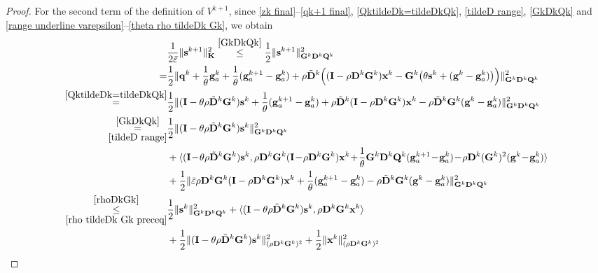 \documentclass[12pt,draftcls,onecolumn]{IEEEtran}
\newcommand{\bG}{{\mathbf{G}}}
\newcommand{\bK}{{\mathbf{K}}}
\begin{document}
\begin{proof}
For the second term of the definition of $V^{k+1}$, since \eqref{zk final}--\eqref{qk+1 final}, \eqref{QktildeDk=tildeDkQk}, \eqref{tildeD range}, \eqref{GkDkQk} and \eqref{range underline varepsilon}--\eqref{theta rho tildeDk Gk}, we obtain
\begin{align}
	&\frac{1}{2\bar{\varepsilon}} \|\mathbf{s}^{k+1}\|^2_{\bK} \overset{\eqref{GkDkQk}}{\leq} \frac{1}{2} \|\mathbf{s}^{k+1}\|^2_{ \mathbf{G}^k\mathbf{D}^k\mathbf{Q}^k} \notag\\
	=& \frac{1}{2}\|\mathbf{q}^k+\frac{1}{\theta}\mathbf{g}_a^k+\frac{1}{\theta}(\mathbf{g}_a^{k+1}-\mathbf{g}_a^{k})+\rho \tilde{\mathbf{D}}^k\Big(( \mathbf{I}-\rho \mathbf{D}^k\bG^k)\mathbf{x}^k-\bG^k\big(\theta \mathbf{s}^k+(\mathbf{g}^k-\mathbf{g}_a^k)\big)\Big)\|^2_{ \mathbf{G}^k\mathbf{D}^k\mathbf{Q}^k}\notag\\
	\overset{\eqref{QktildeDk=tildeDkQk}}{=}& \frac{1}{2}\|(\mathbf{I}-\theta\rho\tilde{\mathbf{D}}^k \bG^k)\mathbf{s}^{k} + \frac{1}{\theta}(\mathbf{g}_a^{k+1}-\mathbf{g}_a^k)+\rho\tilde{\mathbf{D}}^k(\mathbf{I}-\rho \mathbf{D}^k\bG^k)\mathbf{x}^k - \rho\tilde{\mathbf{D}}^k \bG^k(\mathbf{g}^k-\mathbf{g}_a^k)\|^2_{ \mathbf{G}^k\mathbf{D}^k\mathbf{Q}^k} \notag\\
	\underset{\eqref{tildeD range}}{\overset{\eqref{GkDkQk}}{=}} & \frac{1}{2}\|(\mathbf{I}-\theta\rho\tilde{\mathbf{D}}^k \bG^k)\mathbf{s}^{k}\|^2_{ \mathbf{G}^k\mathbf{D}^k\mathbf{Q}^k} \notag\\
    &+\langle (\mathbf{I}\!-\!\theta\rho \tilde{\mathbf{D}}^k\bG^k)\mathbf{s}^k,\rho \mathbf{D}^k \mathbf{G}^k( \mathbf{I}\!-\!\rho \mathbf{D}^k\bG^k)\mathbf{x}^k \!+\!\frac{1}{\theta} \mathbf{G}^k\mathbf{D}^k\mathbf{Q}^k(\mathbf{g}_a^{k+1}\!-\!\mathbf{g}_a^k)\!-\! \rho \mathbf{D}^k(\mathbf{G}^k)^2(\mathbf{g}^k\!-\!\mathbf{g}_a^k)\rangle\notag\\
    &+\frac{1}{2}\|\bar{\varepsilon}\rho{\mathbf{D}}^k\bG^k(\mathbf{I}-\rho \mathbf{D}^k\bG^k)\mathbf{x}^k + \frac{1}{\theta}(\mathbf{g}_a^{k+1}-\mathbf{g}_a^k) - \rho\tilde{\mathbf{D}}^k \bG^k(\mathbf{g}^k-\mathbf{g}_a^k)\|^2_{\mathbf{G}^k\mathbf{D}^k\mathbf{Q}^k}\notag\\
	\underset{\eqref{rho tildeDk Gk preceq}}{\overset{\eqref{rhoDkGk}}{\leq}} & \frac{1}{2}\|\mathbf{s}^{k}\|^2_{ \mathbf{G}^k\mathbf{D}^k\mathbf{Q}^k}+ \langle (\mathbf{I}-\theta\rho \tilde{\mathbf{D}}^k\bG^k)\mathbf{s}^k, \rho \mathbf{D}^k\mathbf{G}^k \mathbf{x}^k \rangle \notag\\
	&+ \frac{1}{2}\|(\mathbf{I}-\theta\rho \tilde{\mathbf{D}}^k\bG^k)\mathbf{s}^{k}\|^2_{ (\rho \mathbf{D}^k\bG^k)^2 } + \frac{1}{2}\|\mathbf{x}^k\|^2_{ (\rho \mathbf{D}^k\mathbf{G}^k)^2 } \notag\\

\end{align}
\end{proof}
\end{document}
